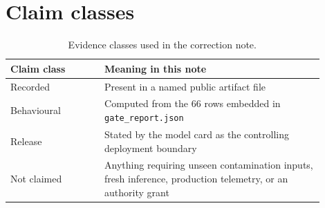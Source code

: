 \documentclass[10pt,letterpaper]{article}
\begin{document}
\section{Claim classes}
\begin{table}[h]
\centering\small
\begin{tabular}{@{}p{0.27\linewidth}p{0.63\linewidth}@{}}
\toprule
Claim class & Meaning in this note \\
\midrule
Recorded & Present in a named public artifact file \\
Behavioural & Computed from the 66 rows embedded in \texttt{gate\_report.json} \\
Release & Stated by the model card as the controlling deployment boundary \\
Not claimed & Anything requiring unseen contamination inputs, fresh inference, production telemetry, or an authority grant \\
\bottomrule
\end{tabular}
\caption{Evidence classes used in the correction note.}
\end{table}
\end{document}
